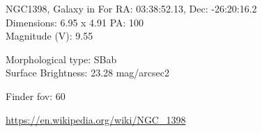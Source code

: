 \begin{block}{NGC1398, Galaxy in For}
    RA: 03:38:52.13, Dec: -26:20:16.2 \\ 
    Dimensions: 6.95 x 4.91 PA: 100 \\ 
    Magnitude (V): 9.55

    Morphological type: SBab \\ 
    Surface Brightness: 23.28 mag/arcsec2 


    Finder fov: 60 

    \url{https://en.wikipedia.org/wiki/NGC_1398} 
\end{block}